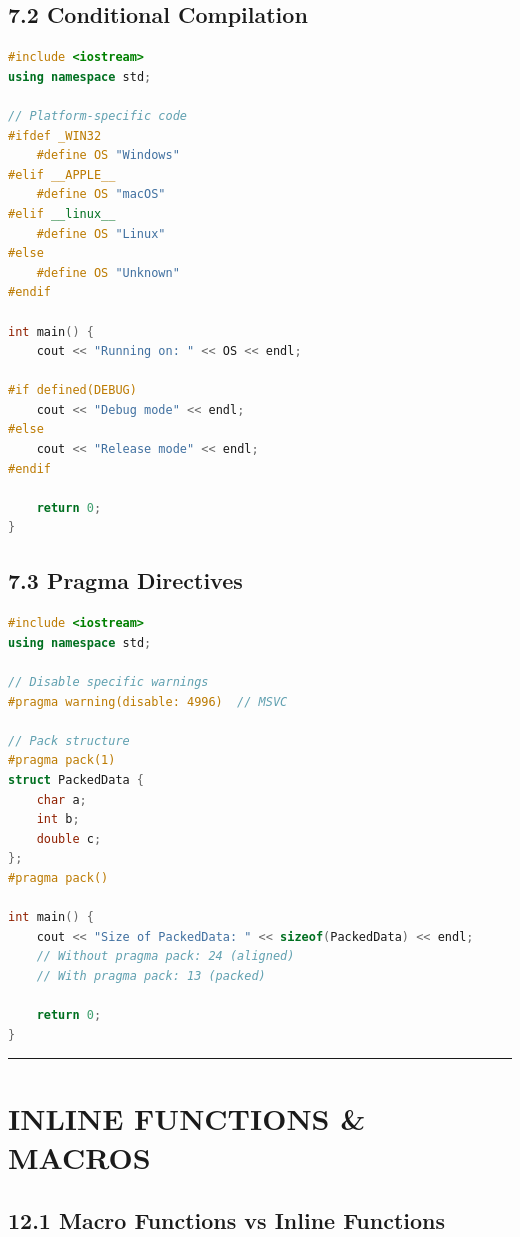\hypertarget{conditional-compilation}{%
\subsection{7.2 Conditional Compilation}\label{conditional-compilation}}

\begin{lstlisting}[language={C++}]
#include <iostream>
using namespace std;

// Platform-specific code
#ifdef _WIN32
    #define OS "Windows"
#elif __APPLE__
    #define OS "macOS"
#elif __linux__
    #define OS "Linux"
#else
    #define OS "Unknown"
#endif

int main() {
    cout << "Running on: " << OS << endl;

#if defined(DEBUG)
    cout << "Debug mode" << endl;
#else
    cout << "Release mode" << endl;
#endif

    return 0;
}
\end{lstlisting}

\hypertarget{pragma-directives}{%
\subsection{7.3 Pragma Directives}\label{pragma-directives}}

\begin{lstlisting}[language={C++}]
#include <iostream>
using namespace std;

// Disable specific warnings
#pragma warning(disable: 4996)  // MSVC

// Pack structure
#pragma pack(1)
struct PackedData {
    char a;
    int b;
    double c;
};
#pragma pack()

int main() {
    cout << "Size of PackedData: " << sizeof(PackedData) << endl;
    // Without pragma pack: 24 (aligned)
    // With pragma pack: 13 (packed)

    return 0;
}
\end{lstlisting}

\begin{center}\rule{0.5\linewidth}{0.5pt}\end{center}

\hypertarget{inline-functions-macros}{%
\section{INLINE FUNCTIONS \& MACROS}\label{inline-functions-macros}}

\hypertarget{macro-functions-vs-inline-functions}{%
\subsection{12.1 Macro Functions vs Inline
Functions}\label{macro-functions-vs-inline-functions}}

